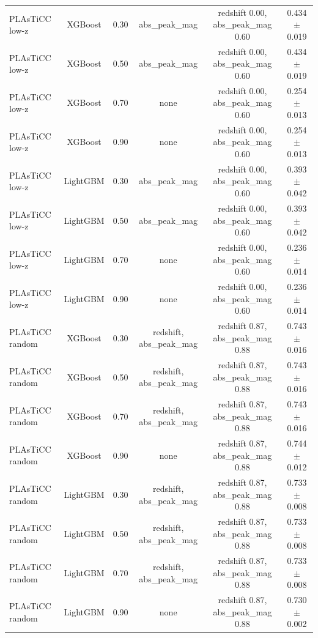 \begin{table}
\begin{tabular}{lccccc}
PLAsTiCC low-z & XGBoost & 0.30 & abs\_peak\_mag & redshift 0.00, abs\_peak\_mag 0.60 & 0.434 $\pm$ 0.019 \\
PLAsTiCC low-z & XGBoost & 0.50 & abs\_peak\_mag & redshift 0.00, abs\_peak\_mag 0.60 & 0.434 $\pm$ 0.019 \\
PLAsTiCC low-z & XGBoost & 0.70 & none & redshift 0.00, abs\_peak\_mag 0.60 & 0.254 $\pm$ 0.013 \\
PLAsTiCC low-z & XGBoost & 0.90 & none & redshift 0.00, abs\_peak\_mag 0.60 & 0.254 $\pm$ 0.013 \\
PLAsTiCC low-z & LightGBM & 0.30 & abs\_peak\_mag & redshift 0.00, abs\_peak\_mag 0.60 & 0.393 $\pm$ 0.042 \\
PLAsTiCC low-z & LightGBM & 0.50 & abs\_peak\_mag & redshift 0.00, abs\_peak\_mag 0.60 & 0.393 $\pm$ 0.042 \\
PLAsTiCC low-z & LightGBM & 0.70 & none & redshift 0.00, abs\_peak\_mag 0.60 & 0.236 $\pm$ 0.014 \\
PLAsTiCC low-z & LightGBM & 0.90 & none & redshift 0.00, abs\_peak\_mag 0.60 & 0.236 $\pm$ 0.014 \\
PLAsTiCC random & XGBoost & 0.30 & redshift, abs\_peak\_mag & redshift 0.87, abs\_peak\_mag 0.88 & 0.743 $\pm$ 0.016 \\
PLAsTiCC random & XGBoost & 0.50 & redshift, abs\_peak\_mag & redshift 0.87, abs\_peak\_mag 0.88 & 0.743 $\pm$ 0.016 \\
PLAsTiCC random & XGBoost & 0.70 & redshift, abs\_peak\_mag & redshift 0.87, abs\_peak\_mag 0.88 & 0.743 $\pm$ 0.016 \\
PLAsTiCC random & XGBoost & 0.90 & none & redshift 0.87, abs\_peak\_mag 0.88 & 0.744 $\pm$ 0.012 \\
PLAsTiCC random & LightGBM & 0.30 & redshift, abs\_peak\_mag & redshift 0.87, abs\_peak\_mag 0.88 & 0.733 $\pm$ 0.008 \\
PLAsTiCC random & LightGBM & 0.50 & redshift, abs\_peak\_mag & redshift 0.87, abs\_peak\_mag 0.88 & 0.733 $\pm$ 0.008 \\
PLAsTiCC random & LightGBM & 0.70 & redshift, abs\_peak\_mag & redshift 0.87, abs\_peak\_mag 0.88 & 0.733 $\pm$ 0.008 \\
PLAsTiCC random & LightGBM & 0.90 & none & redshift 0.87, abs\_peak\_mag 0.88 & 0.730 $\pm$ 0.002 \\
\hline
\end{tabular}
\end{table}
